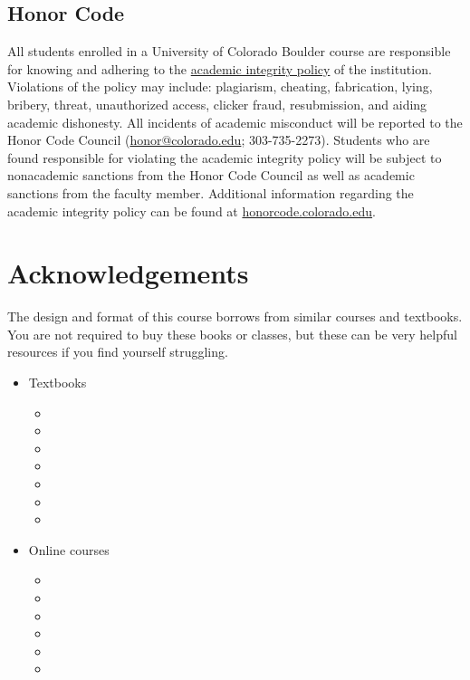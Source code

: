 \documentclass[10pt]{memoir}
\begin{document}
\subsection{Honor Code}
All students enrolled in a University of Colorado Boulder course are responsible for knowing and adhering to the \href{http://www.colorado.edu/policies/academic-integrity-policy}{academic integrity policy} of the institution. Violations of the policy may include: plagiarism, cheating, fabrication, lying, bribery, threat, unauthorized access, clicker fraud, resubmission, and aiding academic dishonesty. All incidents of academic misconduct will be reported to the Honor Code Council (\href{mailto:honor@colorado.edu}{honor@colorado.edu}; 303-735-2273). Students who are found responsible for violating the academic integrity policy will be subject to nonacademic sanctions from the Honor Code Council as well as academic sanctions from the faculty member. Additional information regarding the academic integrity policy can be found at \href{http://honorcode.colorado.edu}{honorcode.colorado.edu}. 

\section{Acknowledgements}
The design and format of this course borrows from similar courses and textbooks. You are not required to buy these books or classes, but these can be very helpful resources if you find yourself struggling.
\begin{itemize}[itemsep=1em]
    \item Textbooks
        \begin{itemize}
        \item {}
        \item {}
        \item {}
        \item {}
        \item {}
        \item {}
        \item {}
        \end{itemize}
    \item Online courses
        \begin{itemize}
        \item {}
        \item {}
        \item {}
        \item {}
        \item {}
        \item {}
        \end{itemize}
\end{itemize}
\end{document}
